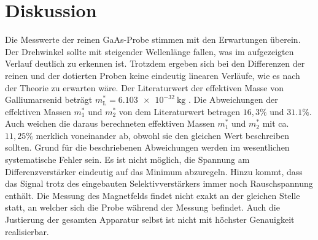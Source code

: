 \section{Diskussion}
\label{sec:Diskussion}
Die Messwerte der reinen GaAs-Probe stimmen mit den Erwartungen überein. Der
Drehwinkel sollte mit steigender Wellenlänge fallen, was im aufgezeigten Verlauf
deutlich zu erkennen ist. Trotzdem ergeben sich bei den Differenzen der reinen
und der dotierten Proben keine eindeutig linearen Verläufe, wie es nach der
Theorie zu erwarten wäre. Der Literaturwert der effektiven Masse von Galliumarsenid beträgt
$m^*_{\mathrm{L}}=\SI{6.103e-32}{\kilo\gram}$ \cite{sample2}. Die Abweichungen der effektiven Massen $m^*_1$ und $m^*_2$  von dem
Literaturwert betragen $16,3 \%$ und $31.1 \%$.
Auch weichen die daraus berechneten effektiven Massen
$m^*_1$ und $m^*_2$ mit ca. $11,25\%$ merklich voneinander ab, obwohl sie den
gleichen Wert beschreiben sollten. Grund für die beschriebenen Abweichungen werden
im wesentlichen systematische Fehler sein. Es ist nicht möglich, die Spannung am
Differenzverstärker eindeutig auf das Minimum abzuregeln. Hinzu kommt, dass das Signal
trotz des eingebauten Selektivverstärkers immer noch Rauschspannung enthält. Die
Messung des Magnetfelds findet nicht exakt an der gleichen Stelle statt, an welcher
sich die Probe während der Messung befindet. Auch die Justierung
der gesamten Apparatur selbst ist nicht mit höchster Genauigkeit realisierbar.
